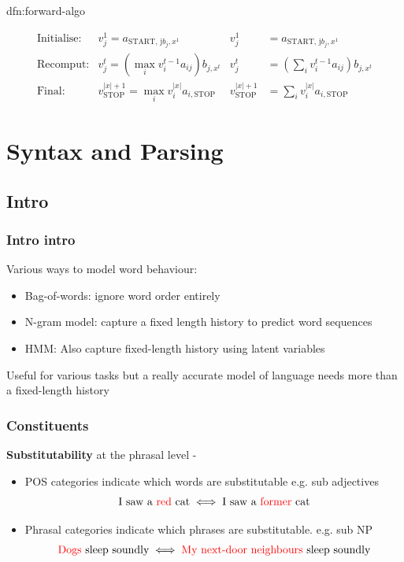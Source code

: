 \documentclass[landscape, 8pt]{extarticle}
\begin{document}
\begin{multicols}{3}
\begin{dfn}{dfn:forward-algo}{}
    
    \begin{align*}
        \text{Initialise:}& v^{1}_{j} = a_{\text{START, j}b_{j}, x^{1}} & v^{1}_{j} &= a_{\text{START, j}b_{j}, x^{1}}\\
        \text{Recomput:}& v^{t}_{j} = \left(\max_{i} v_{i}^{t - 1} a_{ij}\right) b_{j, x^{t}} & v_{j}^t &= \left(\textstyle\sum_{i} v_{i}^{t - 1} a_{ij}\right) b_{j, x^{t}} \\
        \text{Final:}& v_{\text{STOP}}^{\lvert x \rvert + 1} = \max_{i} v_{i}^{\lvert x \rvert} a_{i, \text{STOP}} & v_{\text{STOP}}^{\lvert x \rvert + 1} &= \textstyle\sum_{i} v_{i}^{\lvert x \rvert} a_{i, \text{STOP}}
    \end{align*}
\end{dfn}

\section{Syntax and Parsing}
\subsection{Intro}
\subsubsection{Intro intro}
Various ways to model word behaviour:
\begin{itemize}
    \setlength\itemsep{0em}
    \item Bag-of-words: ignore word order entirely
    \item N-gram model: capture a fixed length history to predict word sequences
    \item HMM: Also capture fixed-length history using latent variables
\end{itemize}

Useful for various tasks but a really accurate model of language needs more than a fixed-length history

\subsubsection{Constituents}
\textbf{Substitutability} at the phrasal level - 
\begin{itemize}[leftmargin=*]
    \setlength\itemsep{0em}
    \item POS categories indicate which words are substitutable e.g. sub adjectives
        \[\text{I saw a \textcolor{red}{red} cat} \iff \text{I saw a \textcolor{red}{former} cat}\]
    \item Phrasal categories indicate which phrases are substitutable. e.g. sub NP
        \[\text{\textcolor{red}{Dogs} sleep soundly} \iff \text{\textcolor{red}{My next-door neighbours} sleep soundly}\]
\end{itemize}


\end{multicols}
\end{document}

